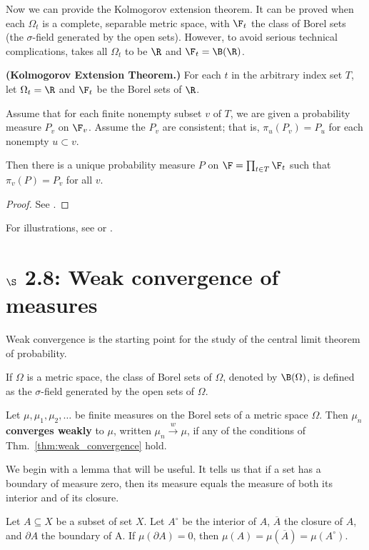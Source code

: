 \documentclass{article} %
\newcommand{\weakConvergence}{\stackrel{w}{\to}}
\newcommand{\interior}[1]{{#1}^\circ}
\begin{document}
Now we can provide the Kolmogorov extension theorem.  It can be proved when each $\Omega_t$ is a complete, separable metric space, with $\F_t$ the class of Borel sets (the $\sigma$-field generated by the open sets). However, to avoid serious technical complications, \cite{ash2000probability} takes all $\Omega_t$ to be $\R$ and $\F_t =\B(\R)$. 

\begin{theorem}\textnormal{\textbf{(Kolmogorov Extension Theorem.)}} For each $t$ in the arbitrary index set $T$, let $\Omega_t = \R$ and $\F_t$ be the Borel sets of $\R$.  

Assume that for each finite nonempty subset $v$ of $T$, we are given a probability measure $P_v$ on $\F_v$.   Assume the $P_v$ are consistent; that is, $\pi_u(P_v) = P_u$ for each nonempty $u \subset v$. 

Then there is a unique probability measure $P$ on $\F = \prod_{t \in T} \F_t$ such that $\pi_v(P)=P_v$ for all $v$.
\end{theorem}

\begin{proof}
See \cite[pp.18]{ash2000probability}.	
\end{proof}

For illustrations, see \cite[Fig.~2.7.1, pp.117]{ash2000probability} or \cite[Fig 1.1, pp.4]{matthews2017scalable}.

\section{$\S$ 2.8: Weak convergence of measures}

Weak convergence is the starting point for the study of the central limit theorem of probability.

If $\Omega$ is a metric space, the class of Borel sets of $\Omega$, denoted by $\B(\Omega)$, is defined as the $\sigma$-field generated by the open sets of $\Omega$.

\begin{definition}
Let $\mu, \mu_1, \mu_2, \hdots$ be finite measures on the Borel sets of a metric space $\Omega$.  Then $\mu_n$ \textbf{converges weakly} to $\mu$, written $\mu_n \weakConvergence \mu$,  if any of the conditions of Thm.~\ref{thm:weak_convergence} hold.
\label{def:weak_convergence}
\end{definition}

We begin with a lemma that will be useful.  It tells us that if a set has a boundary of measure zero, then its measure equals the measure of both its interior and of its closure.
\begin{lemma}
Let $A \subseteq X$ be a subset of set $X$. Let $\interior{A}$ be the interior of $A$, $\overline{A}$ the closure of $A$, and $\partial A$ the boundary of A.  If $\mu(\partial A) =0$, then $\mu(A) = \mu(\overline{A}) = \mu(\interior{A})$.
\label{lemma:null_boundaries_mean_that_a_set_has_the_same_measure_as_its_interior_and_its_closure}
\end{lemma}
\end{document}
